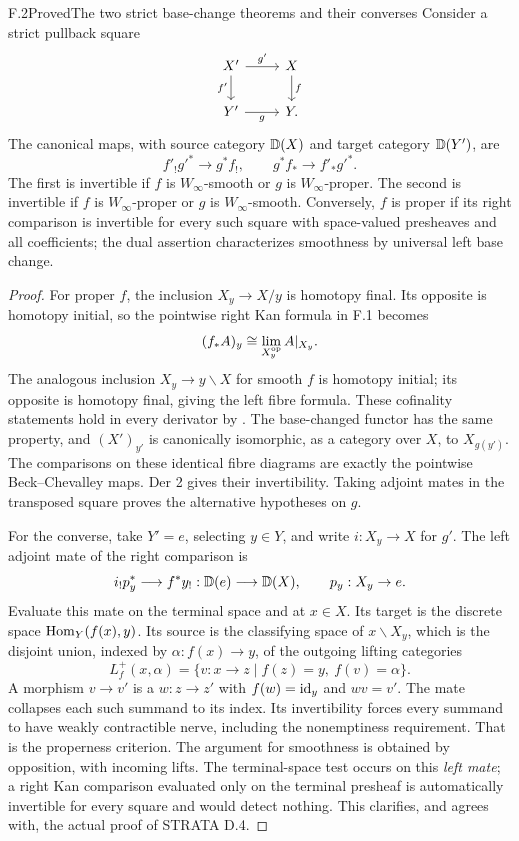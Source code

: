 \begin{claim}{F.2}{Proved}{The two strict base-change theorems and their converses}
Consider a strict pullback square
\[
\begin{tikzcd}
X'\ar[r,"g'"]\ar[d,"f'"']&X\ar[d,"f"]\\
Y'\ar[r,"g"']&Y.
\end{tikzcd}
\]
The canonical maps, with source category $\mathbb D(X)$ and target category $\mathbb D(Y')$, are
\[
 f'_!g'^*\longrightarrow g^*f_!,\qquad
 g^*f_*\longrightarrow f'_*g'^*.
\]
The first is invertible if $f$ is $W_\infty$-smooth or $g$ is $W_\infty$-proper. The second is invertible if $f$ is $W_\infty$-proper or $g$ is $W_\infty$-smooth. Conversely, $f$ is proper if its right comparison is invertible for every such square with space-valued presheaves and all coefficients; the dual assertion characterizes smoothness by universal left base change.
\end{claim}
\begin{proof}
For proper $f$, the inclusion $X_y\to X/y$ is homotopy final. Its opposite is homotopy initial, so the pointwise right Kan formula in F.1 becomes
\[
 (f_*A)_y\cong\lim_{X_y^{\mathrm{op}}}A|_{X_y}.
\]
The analogous inclusion $X_y\to y\backslash X$ for smooth $f$ is homotopy initial; its opposite is homotopy final, giving the left fibre formula. These cofinality statements hold in every derivator by \citet[Theorems 3.8 and 3.16]{EFGPS2014a}. The base-changed functor has the same property, and $(X')_{y'}$ is canonically isomorphic, as a category over $X$, to $X_{g(y')}$. The comparisons on these identical fibre diagrams are exactly the pointwise Beck--Chevalley maps. Der 2 gives their invertibility. Taking adjoint mates in the transposed square proves the alternative hypotheses on $g$.

For the converse, take $Y'=e$, selecting $y\in Y$, and write $i:X_y\to X$ for $g'$. The left adjoint mate of the right comparison is
\[
 i_!p_y^*\longrightarrow f^*y_!: \mathbb D(e)\longrightarrow\mathbb D(X),
 \qquad p_y:X_y\to e.
\]
Evaluate this mate on the terminal space and at $x\in X$. Its target is the discrete space $\mathrm{Hom}_Y(f(x),y)$. Its source is the classifying space of $x\backslash X_y$, which is the disjoint union, indexed by $\alpha:f(x)\to y$, of the outgoing lifting categories
\[
 L^+_f(x,\alpha)=\{v:x\to z\mid f(z)=y,\ f(v)=\alpha\}.
\]
A morphism $v\to v'$ is a $w:z\to z'$ with $f(w)=\mathrm{id}_y$ and $wv=v'$. The mate collapses each such summand to its index. Its invertibility forces every summand to have weakly contractible nerve, including the nonemptiness requirement. That is the properness criterion. The argument for smoothness is obtained by opposition, with incoming lifts. The terminal-space test occurs on this \emph{left mate}; a right Kan comparison evaluated only on the terminal presheaf is automatically invertible for every square and would detect nothing. This clarifies, and agrees with, the actual proof of STRATA D.4.
\end{proof}

